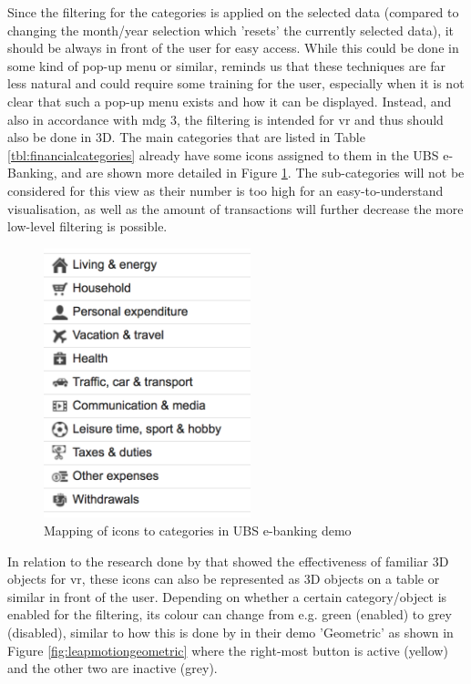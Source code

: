 Since the filtering for the categories is applied on the selected data (compared to changing the month/year selection which 'resets' the currently selected data), it should be always in front of the user for easy access. While this could be done in some kind of pop-up menu or similar, \cite{Bowman2002} reminds us that these techniques are far less natural and could require some training for the user, especially when it is not clear that such a pop-up menu exists and how it can be displayed. Instead, and also in accordance with \gls{mdg} 3, the filtering is intended for \gls{vr} and thus should also be done in 3D. The main categories that are listed in Table \ref{tbl:financialcategories} already have some icons assigned to them in the UBS e-Banking, and are shown more detailed in Figure \ref{fig:categoriesicons}. The sub-categories will not be considered for this view as their number is too high for an easy-to-understand visualisation, as well as the amount of transactions will further decrease the more low-level filtering is possible.
\begin{figure}[h]
	\begin{center}
		\includegraphics[width=6cm]{03_Figures/07_Suggestion/UBSAG2016_CategoriesIcons.png}
		\caption[Mapping of icons to categories in UBS e-banking demo]{Mapping of icons to categories in UBS e-banking demo \citep{UBSAG2016}}
		\label{fig:categoriesicons}
	\end{center}
\end{figure} \newline
In relation to the research done by \cite{Jamieson2007} that showed the effectiveness of familiar 3D objects for \gls{vr}, these icons can also be represented as 3D objects on a table or similar in front of the user. Depending on whether a certain category/object is enabled for the filtering, its colour can change from e.g. green (enabled) to grey (disabled), similar to how this is done by \cite{LeapMotion2016} in their demo 'Geometric' as shown in Figure \ref{fig:leapmotiongeometric} where the right-most button is active (yellow) and the other two are inactive (grey).
